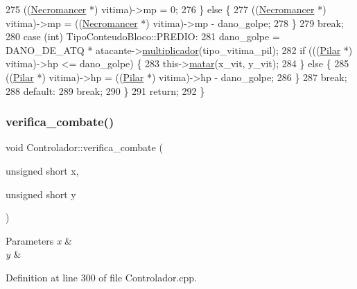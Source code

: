 \begin{DoxyCode}
275                 ((\mbox{\hyperlink{class_necromancer}{Necromancer}} *) vitima)->mp = 0;
276             \} \textcolor{keywordflow}{else} \{
277                 ((\mbox{\hyperlink{class_necromancer}{Necromancer}} *) vitima)->mp = ((\mbox{\hyperlink{class_necromancer}{Necromancer}} *) vitima)->mp - 
      dano\_golpe;
278             \}
279             \textcolor{keywordflow}{break};
280         \textcolor{keywordflow}{case} (\textcolor{keywordtype}{int}) TipoConteudoBloco::PREDIO:
281             dano\_golpe = DANO\_DE\_ATQ * atacante->\mbox{\hyperlink{class_necromancer_ae276261d4338078bb09b24e73c1abb5b}{multiplicador}}(tipo\_vitima\_pil);
282             \textcolor{keywordflow}{if} (((\mbox{\hyperlink{class_pilar}{Pilar}} *) vitima)->hp <= dano\_golpe) \{
283                 this->\mbox{\hyperlink{class_controlador_a2455948558b79285060dbd2dd8d15bf1}{matar}}(x\_vit, y\_vit);
284             \} \textcolor{keywordflow}{else} \{
285                 ((\mbox{\hyperlink{class_pilar}{Pilar}} *) vitima)->hp = ((\mbox{\hyperlink{class_pilar}{Pilar}} *) vitima)->hp - dano\_golpe;
286             \}
287             \textcolor{keywordflow}{break};
288         \textcolor{keywordflow}{default}:
289             \textcolor{keywordflow}{break};
290     \}
291     \textcolor{keywordflow}{return};
292 \}
\end{DoxyCode}
\mbox{\label{class_controlador_ad836b4790965ddd4b654a42235b8267e}} 
\subsubsection{\texorpdfstring{verifica\+\_\+combate()}{verifica\_combate()}}
{\footnotesize\ttfamily void Controlador\+::verifica\+\_\+combate (\begin{DoxyParamCaption}\item[{unsigned short}]{x,  }\item[{unsigned short}]{y }\end{DoxyParamCaption})}


\begin{DoxyParams}{Parameters}
{\em x} & \\
\hline
{\em y} & \\
\hline
\end{DoxyParams}


Definition at line 300 of file Controlador.\+cpp.



